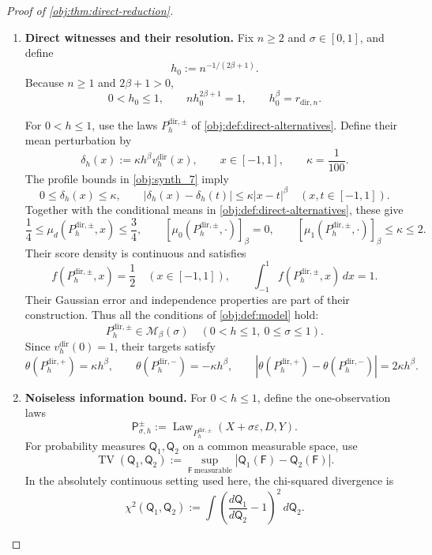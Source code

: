 \documentclass[11pt]{article}
\begin{document}
\begin{proof}[Proof of \cref{obj:thm:direct-reduction}]
\begin{enumerate}
\item \textbf{Direct witnesses and their resolution.}
Fix \(n\ge2\) and \(\sigma\in[0,1]\), and define
\[
h_0:=n^{-1/(2\beta+1)}.
\]
Because \(n\ge1\) and \(2\beta+1>0\),
\[
0<h_0\le1,
\qquad
nh_0^{2\beta+1}=1,
\qquad
h_0^\beta=r_{\mathrm{dir},n}.
\]

For \(0<h\le1\), use the laws \(P_h^{\mathrm{dir},\pm}\) of \cref{obj:def:direct-alternatives}. Define their mean perturbation by
\[
\delta_h(x):=\kappa h^\beta v_h^{\mathrm{dir}}(x),
\qquad x\in[-1,1],
\qquad
\kappa=\frac1{100}.
\]
The profile bounds in \cref{obj:synth_7} imply
\[
0\le\delta_h(x)\le\kappa,
\qquad
|\delta_h(x)-\delta_h(t)|
\le\kappa|x-t|^\beta
\quad(x,t\in[-1,1]).
\]
Together with the conditional means in \cref{obj:def:direct-alternatives}, these give
\[
\frac14
\le\mu_d(P_h^{\mathrm{dir},\pm},x)
\le\frac34,
\qquad
[\mu_0(P_h^{\mathrm{dir},\pm},\cdot)]_\beta=0,
\qquad
[\mu_1(P_h^{\mathrm{dir},\pm},\cdot)]_\beta\le\kappa\le2.
\]
Their score density is continuous and satisfies
\[
f(P_h^{\mathrm{dir},\pm},x)=\frac12
\quad(x\in[-1,1]),
\qquad
\int_{-1}^1f(P_h^{\mathrm{dir},\pm},x)\,dx=1.
\]
Their Gaussian error and independence properties are part of their construction. Thus all the conditions of \cref{obj:def:model} hold:
\[
P_h^{\mathrm{dir},\pm}\in\mathcal M_\beta(\sigma)
\quad(0<h\le1,\ 0\le\sigma\le1).
\]
Since \(v_h^{\mathrm{dir}}(0)=1\), their targets satisfy
\[
\theta(P_h^{\mathrm{dir},+})=\kappa h^\beta,
\qquad
\theta(P_h^{\mathrm{dir},-})=-\kappa h^\beta,
\qquad
\left|\theta(P_h^{\mathrm{dir},+})
-\theta(P_h^{\mathrm{dir},-})\right|
=2\kappa h^\beta.
\]

\item \textbf{Noiseless information bound.}
For \(0<h\le1\), define the one-observation laws
\[
\mathsf P_{\sigma,h}^{\pm}
:=\operatorname{Law}_{P_h^{\mathrm{dir},\pm}}
(X+\sigma\varepsilon,D,Y).
\]
For probability measures \(\mathsf Q_1,\mathsf Q_2\) on a common measurable space, use
\[
\operatorname{TV}(\mathsf Q_1,\mathsf Q_2)
:=\sup_{\mathsf F\ \mathrm{measurable}}
|\mathsf Q_1(\mathsf F)-\mathsf Q_2(\mathsf F)|.
\]
In the absolutely continuous setting used here, the chi-squared divergence is
\[
\chi^2(\mathsf Q_1,\mathsf Q_2)
:=\int
\left(\frac{d\mathsf Q_1}{d\mathsf Q_2}-1\right)^2
\,d\mathsf Q_2.
\]


\end{enumerate}
\end{proof}
\end{document}
